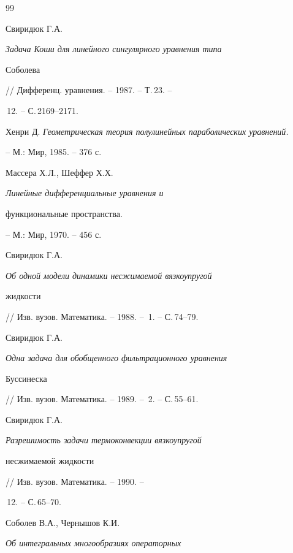 \begin{thebibliography}{99} 


 




Свиридюк Г.А. {\em Задача Коши для линейного сингулярного уравнения типа 


Соболева} // Дифференц. уравнения. -- 1987. -- Т.\,23. -- 


\No\,12. -- С.\,2169--2171. 


 




Хенри Д. {\em Геометрическая теория полулинейных параболических уравнений.} 


-- М.: Мир, 1985. -- 376 с. 


 




Массера Х.Л., Шеффер Х.Х. {\em Линейные дифференциальные уравнения и 


функциональные пространства.} -- М.: Мир, 1970. -- 456 с. 


 




Свиридюк Г.А. {\em Об одной модели динамики несжимаемой вязкоупругой 


жидкости} // Изв. вузов. Математика. -- 1988. -- \No\,1. -- С.\,74--79. 


 




Свиридюк Г.А. {\em Одна задача для обобщенного фильтрационного уравнения 


Буссинеска} // Изв. вузов. Математика. -- 1989. -- \No\,2. -- С.\,55--61. 


 




Свиридюк Г.А. {\em Разрешимость задачи термоконвекции вязкоупругой 


несжимаемой жидкости} // Изв. вузов. Математика. -- 1990. -- 


\No\,12. -- С.\,65--70. 


 




Соболев В.А., Чернышов К.И. {\em Об интегральных многообразиях операторных 


}
\end{thebibliography}
